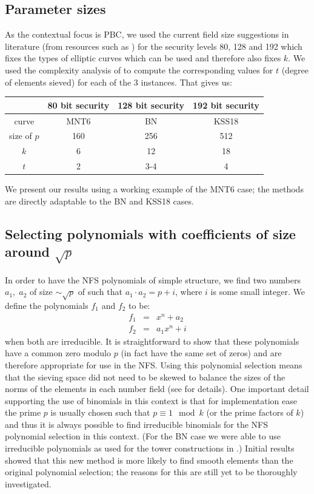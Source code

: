 \documentclass[a4paper, 10pt, envcountsect, runningheads]{lms}
\numberwithin{figure}{section}
\numberwithin{equation}{section}
\begin{document}
\subsection*{Parameter sizes}
As the contextual focus is PBC, we used the current field size suggestions in literature (from resources such as \cite{lenstra-verheul,lenstra01,ECRYPT_key_sizes}) for the security levels 80, 128 and 192 which fixes the types of elliptic curves which can be used and therefore also fixes $k$. We used the complexity analysis of \cite{joux-lercier-smart-vercauteren06} to compute the corresponding values for $t$ (degree of elements sieved) for each of the 3 instances. That gives us:
\begin{center}
\begin{tabular}{|c|c|c|c|}
\hline
&80 bit security & 128 bit security & 192 bit security\\
\hline
curve & MNT6 & BN & KSS18\\
size of $p$ & 160 & 256 & 512\\
$k$ & 6 & 12 & 18\\
$t$ & 2 & 3-4 & 4\\
\hline
\end{tabular}
\end{center}
We present our results using a working example of the MNT6 case; the methods are directly adaptable to the BN and KSS18 cases. 
\subsection{Selecting polynomials with coefficients of size around $\sqrt{p}$}
\label{ss:poly_selection}
In order to have the NFS polynomials of simple structure, we find two numbers $a_1,\;a_2$ of size $\sim\sqrt{p}$ of such that $a_1\cdot a_2=p+i$, where $i$ is some small integer. We define the polynomials $f_1$ and $f_2$ to be:
\begin{eqnarray*}
f_1 &=& x^n + a_2\\
f_2 &=& a_1 x^n + i
\end{eqnarray*}
when both are irreducible. It is straightforward to show that these polynomials have a common zero modulo $p$ (in fact have the same set of zeros) and are therefore appropriate for use in the NFS. Using this polynomial selection means that the sieving space did not need to be skewed to balance the sizes of the norms of the elements in each number field (see \cite{joux-lercier-smart-vercauteren06} for details). One important detail supporting the use of binomials in this context is that for implementation ease the prime $p$ is usually chosen such that $p\equiv1\mod k$ (or the prime factors of $k$)\cite{koblitz-menezes05} and thus it is always possible to find irreducible binomials for the NFS polynomial selection in this context. (For the BN case we were able to use irreducible polynomials as used for the tower constructions in \cite{towers}.) Initial results showed that this new method is more likely to find smooth elements than the original polynomial selection; the reasons for this are still yet to be thoroughly investigated.
\end{document}
